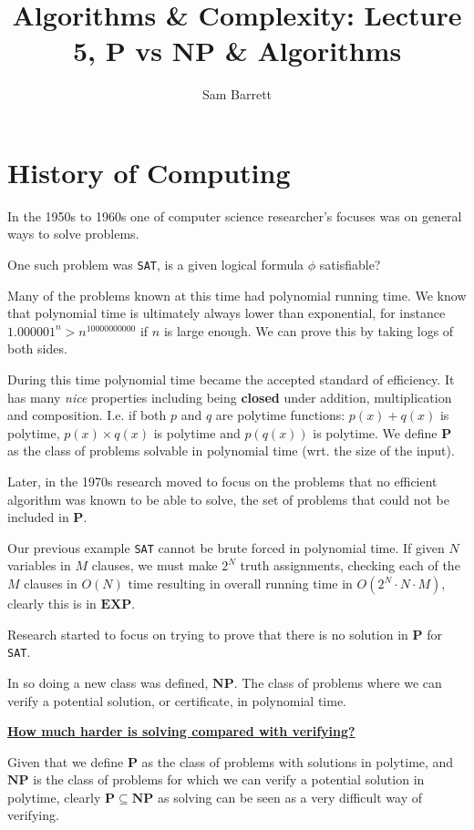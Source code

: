 \documentclass{article}
\title{Algorithms \& Complexity: Lecture 5, P vs NP \& Algorithms}
\author{Sam Barrett}
\newcommand{\NP}{\mathbf{NP}}
\renewcommand{\P}{\mathbf{P}}
\begin{document}
\maketitle

\section{History of Computing}
\label{sec:history}

In the 1950s to 1960s one of computer science researcher's focuses was on general ways to solve problems.

One such problem was \texttt{SAT}, is a given logical formula \(\phi\) satisfiable?

Many of the problems known at this time had polynomial running time. We know that polynomial time is ultimately always lower than exponential, for instance $1.000001^{n} > n^{10000000000}$ if $n$ is large enough. We can prove this by taking logs of both sides.

During this time polynomial time became the accepted standard of efficiency. It has many \textit{nice} properties including being \textbf{closed } under addition, multiplication and composition. I.e. if both $p$ and $q$ are polytime functions: $p(x) + q(x)$ is polytime, $p(x)\times   q(x)$ is polytime and $p(q(x))$ is polytime. We define $\P$ as the class of problems solvable in polynomial time (wrt. the size of the input).


Later, in the 1970s research moved to focus on the problems that no efficient algorithm was known to be able to solve, the set of problems that could not be included in $\P$.

Our previous example \texttt{SAT} cannot be brute forced in polynomial time. If given $N$ variables in $M$ clauses, we must make $2^{N}$ truth assignments, checking each of the $M$ clauses in $O(N)$ time resulting in overall running time in $O(2^{N}\cdot N \cdot M)$, clearly this is in $\mathbf{EXP} $.

Research started to focus on trying to prove that there is no solution in $\P$ for \texttt{SAT}.

In so doing a new class was defined, $\NP$. The class of problems where we can verify a potential solution, or certificate, in polynomial time.

\textbf{\underline{How much harder is solving compared with verifying?}}

Given that we define $\P$ as the class of problems with solutions in polytime, and $\NP$ is the class of problems for which we can verify a potential solution in polytime, clearly $\P \subseteq \NP$ as solving can be seen as a very difficult way of verifying.
\end{document}
